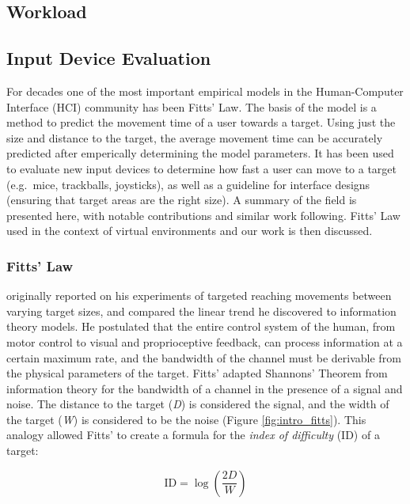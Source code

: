 \subsection{Workload}


\subsection{Input Device Evaluation}
\label{input-device-evaluation}

For decades one of the most important empirical models in the Human-Computer Interface (HCI) community has been Fitts' Law.
The basis of the model is a method to predict the movement time of a user towards a target.
Using just the size and distance to the target, the average movement time can be accurately predicted after emperically determining the model parameters.
It has been used to evaluate new input devices to determine how fast a user can move to a target (e.g.\ mice, trackballs, joysticks), as well as a guideline for interface designs (ensuring that target areas are the right size).
A summary of the field is presented here, with notable contributions and similar work following.
Fitts' Law used in the context of virtual environments and our work is then discussed.

\subsubsection{Fitts' Law}
\label{fitts-law}

\citet{fitts_information_1954} originally reported on his experiments of targeted reaching movements between varying target sizes, and compared the linear trend he discovered to information theory models.
He postulated that the entire control system of the human, from motor control to visual and proprioceptive feedback, can process information at a certain maximum rate, and the bandwidth of the channel must be derivable from the physical parameters of the target.
Fitts' adapted Shannons' Theorem \citep{shannon_communication_1949} from information theory for the bandwidth of a channel in the presence of a signal and noise.
The distance to the target (\emph{D}) is considered the signal, and the width of the target (\emph{W}) is considered to be the noise (Figure \ref{fig:intro_fitts}).
This analogy allowed Fitts' to create a formula for the \emph{index of difficulty} (\(\text{ID}\)) of a target:

\begin{equation}
    \mathrm{ID} = \log\left(\frac{2D}{W}\right)
    \label{eq:intro_id}
\end{equation}

